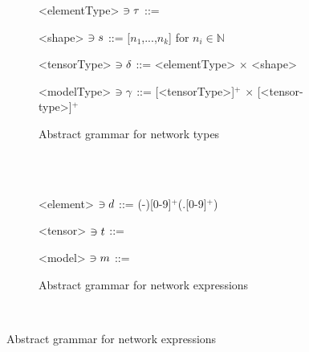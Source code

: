 \begin{figure}
	\newcommand{\tensorOpOneSem}[2]{ 
		\semTensorType(#1) \rightarrow 
		\semTensorType(#2)
	}
	\newcommand{\tensorOpTwoSem}[3]{
		\semTensorType(#1) \rightarrow 
		\semTensorType(#2) \rightarrow 
		\semTensorType(#3) 
	}
	\newcommand{\compSem}[1]{
	\sem{#1} 
	&: \forall \tensorTypeVar. \; 
			\semTensorType(\tensorTypeVar) \rightarrow
			\semTensorType(\tensorTypeVar) \rightarrow
			\mathbb{B}
	&= \missing 
	}
	\newcommand{\opOneSem}[1]{
	\sem{#1}
	&: \forall \tensorTypeVar. \; 
			\tensorOpOneSem{\tensorTypeVar}{\tensorTypeVar}
	&= \missing 
	}
	\newcommand{\opTwoSem}[1]{
	\sem{#1} 
	&: \forall \tensorTypeVar. \; 
			\tensorOpTwoSem{\tensorTypeVar}{\tensorTypeVar}{\tensorTypeVar}
	&= \missing 
	}
	
	\begin{subfigure}{\textwidth}
	\setlength{\grammarindent}{9em}
	\begin{grammar}	
	<elementType> $\ni \tau$ ::= \missing	
	
	<shape> $\ni s$ ::= [$n_1$,...,$n_k$] \hspace{1em} for $n_i \in \mathbb{N}$ 
	
	<tensorType> $\ni \delta$ ::= <elementType>  $\times$ <shape>
	
	<modelType> $\ni \gamma$ ::= [<tensorType>]$^+$ $\times$ [<tensor-type>]$^+$
	\end{grammar}
	\caption{Abstract grammar for network types}
	\label{fig:onnx-type-syntax}
	\end{subfigure}
	\\
	\\
	
	\begin{subfigure}{\textwidth}
	\centering
	\begin{minipage}[t]{0.44\textwidth}
	\begin{grammar}	
	<element> $\ni d$ ::= (-)[0-9]$^+$(.[0-9]$^+$)
	\end{grammar}
	\end{minipage}
	\hfill
	\begin{minipage}[t]{0.23\textwidth}
	\begin{grammar}	
	<tensor> $\ni t$ ::= \missing
	\end{grammar}
	\end{minipage}
	\hfill
	\begin{minipage}[t]{0.24\textwidth}
	\begin{grammar}
	<model> $\ni m$ ::= \missing
	\end{grammar}
	\end{minipage}
	\vspace{0.8em}
	\caption{Abstract grammar for network expressions}
	\label{fig:onnx-expr-syntax}
	\end{subfigure}
	\\
	

\end{figure}
